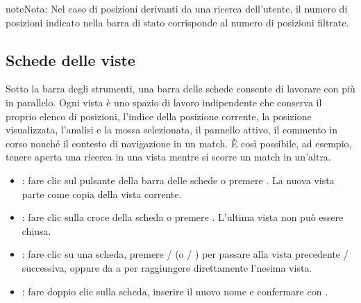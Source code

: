 \documentclass[letterpaper,10pt,italian]{sphinxmanual}
\begin{document}
\begin{sphinxadmonition}{note}{Nota:}
\sphinxAtStartPar
Nel caso di posizioni derivanti da una ricerca dell’utente, il numero di posizioni indicato nella barra di stato corrisponde al numero di posizioni filtrate.
\end{sphinxadmonition}


\subsection{Schede delle viste}
\label{\detokenize{manuel:onglets-de-vues}}\label{\detokenize{manuel:onglets-vues}}
\sphinxAtStartPar
Sotto la barra degli strumenti, una barra delle schede consente di lavorare con più  in parallelo. Ogni vista è uno spazio di lavoro indipendente che conserva il proprio elenco di posizioni, l’indice della posizione corrente, la posizione visualizzata, l’analisi e la mossa selezionata, il pannello attivo, il commento in corso nonché il contesto di navigazione in un match. È così possibile, ad esempio, tenere aperta una ricerca in una vista mentre si scorre un match in un’altra.
\begin{itemize}
\item {} 
\sphinxAtStartPar
{} : fare clic sul pulsante \sphinxstyleemphasis{+} della barra delle schede o premere . La nuova vista parte come copia della vista corrente.

\item {} 
\sphinxAtStartPar
{} : fare clic sulla croce della scheda o premere . L’ultima vista non può essere chiusa.

\item {} 
\sphinxAtStartPar
{} : fare clic su una scheda, premere  /  (o  / ) per passare alla vista precedente / successiva, oppure da  a  per raggiungere direttamente l’n\sphinxhyphen{}esima vista.

\item {} 
\sphinxAtStartPar
{} : fare doppio clic sulla scheda, inserire il nuovo nome e confermare con .

\end{itemize}
\end{document}
